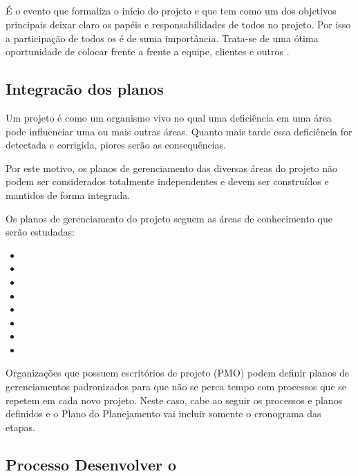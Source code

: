 \subsection{\Kick}

É o evento que formaliza o início do projeto e que tem como um dos objetivos principais deixar claro os papéis e responsabilidades de todos no projeto. Por isso a participação de todos os \stake é de suma importância. Trata-se de uma ótima oportunidade de colocar frente a frente a equipe, clientes e outros \stake.

\subsection{Integracão dos planos}

Um projeto é como um organismo vivo no qual uma deficiência em uma área pode influenciar uma ou mais outras áreas. Quanto mais tarde essa deficiência for detectada e corrigida, piores serão as consequências.

Por este motivo, os planos de gerenciamento das diversas áreas do projeto não podem ser considerados totalmente independentes e devem ser construídos e mantidos de forma integrada.

Os planos de gerenciamento do projeto seguem as áreas de conhecimento que serão estudadas:

\begin{itemize}

\item \planesc
\item \plancron
\item \plancusto
\item \planqual
\item \planpess
\item \plancom
\item \planrisco
\item \planaq

\end{itemize}

Organizações que possuem escritórios de projeto (PMO) podem definir planos de gerenciamentos padronizados para que não se perca tempo com processos que se repetem em cada novo projeto. Neste caso, cabe ao \gp seguir os processos e planos definidos e o Plano do Planejamento vai incluir somente o cronograma das etapas.

\subsection{Processo Desenvolver o \planproj}

